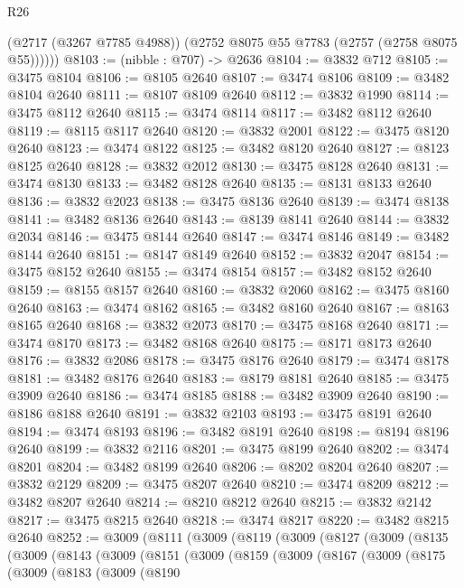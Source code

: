 \begin{lexlean}{R26}
\begin{coremodule}
          (@2717 (@3267 @7785 @4988))
          (@2752 @8075 @55 @7783 (@2757 (@2758 @8075 @55))))))
@8103 := (nibble : @707) -> @2636
@8104 := @3832 @712
@8105 := @3475 @8104
@8106 := @8105 @2640
@8107 := @3474 @8106
@8109 := @3482 @8104 @2640
@8111 := @8107 @8109 @2640
@8112 := @3832 @1990
@8114 := @3475 @8112 @2640
@8115 := @3474 @8114
@8117 := @3482 @8112 @2640
@8119 := @8115 @8117 @2640
@8120 := @3832 @2001
@8122 := @3475 @8120 @2640
@8123 := @3474 @8122
@8125 := @3482 @8120 @2640
@8127 := @8123 @8125 @2640
@8128 := @3832 @2012
@8130 := @3475 @8128 @2640
@8131 := @3474 @8130
@8133 := @3482 @8128 @2640
@8135 := @8131 @8133 @2640
@8136 := @3832 @2023
@8138 := @3475 @8136 @2640
@8139 := @3474 @8138
@8141 := @3482 @8136 @2640
@8143 := @8139 @8141 @2640
@8144 := @3832 @2034
@8146 := @3475 @8144 @2640
@8147 := @3474 @8146
@8149 := @3482 @8144 @2640
@8151 := @8147 @8149 @2640
@8152 := @3832 @2047
@8154 := @3475 @8152 @2640
@8155 := @3474 @8154
@8157 := @3482 @8152 @2640
@8159 := @8155 @8157 @2640
@8160 := @3832 @2060
@8162 := @3475 @8160 @2640
@8163 := @3474 @8162
@8165 := @3482 @8160 @2640
@8167 := @8163 @8165 @2640
@8168 := @3832 @2073
@8170 := @3475 @8168 @2640
@8171 := @3474 @8170
@8173 := @3482 @8168 @2640
@8175 := @8171 @8173 @2640
@8176 := @3832 @2086
@8178 := @3475 @8176 @2640
@8179 := @3474 @8178
@8181 := @3482 @8176 @2640
@8183 := @8179 @8181 @2640
@8185 := @3475 @3909 @2640
@8186 := @3474 @8185
@8188 := @3482 @3909 @2640
@8190 := @8186 @8188 @2640
@8191 := @3832 @2103
@8193 := @3475 @8191 @2640
@8194 := @3474 @8193
@8196 := @3482 @8191 @2640
@8198 := @8194 @8196 @2640
@8199 := @3832 @2116
@8201 := @3475 @8199 @2640
@8202 := @3474 @8201
@8204 := @3482 @8199 @2640
@8206 := @8202 @8204 @2640
@8207 := @3832 @2129
@8209 := @3475 @8207 @2640
@8210 := @3474 @8209
@8212 := @3482 @8207 @2640
@8214 := @8210 @8212 @2640
@8215 := @3832 @2142
@8217 := @3475 @8215 @2640
@8218 := @3474 @8217
@8220 := @3482 @8215 @2640
@8252 := @3009
    (@8111
      (@3009
        (@8119
          (@3009
            (@8127
              (@3009
                (@8135
                  (@3009
                    (@8143
                      (@3009
                        (@8151
                          (@3009
                            (@8159
                              (@3009
                                (@8167
                                  (@3009
                                    (@8175
                                      (@3009
                                        (@8183
                                          (@3009
                                            (@8190

\end{coremodule}
\end{lexlean}
